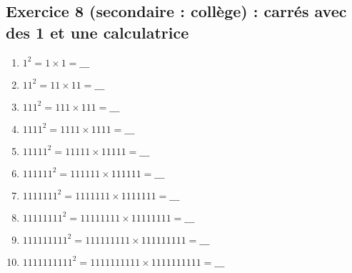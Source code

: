\subsection{Exercice 8 (secondaire : collège) : carrés avec des 1 et une calculatrice}


\label{calc:niveau8}

\begin{enumerate}[label=C\arabic*)]
    \item \(1^2 = 1 \times 1 =  \_\_\_\)
    \item \(11^2 = 11 \times 11 = \_\_\_\)
    \item \(111^2 = 111 \times 111 = \_\_\_\)
    \item \(1111^2 = 1111 \times 1111 = \_\_\_\)
    \item \(11111^2 = 11111 \times 11111 = \_\_\_\)
    \item \(111111^2 = 111111 \times 111111 = \_\_\_\)
    \item \(1111111^2 = 1111111 \times 1111111 = \_\_\_\)
    \item \(11111111^2 = 11111111 \times 11111111 = \_\_\_\)
    \item \(111111111^2 = 111111111 \times 111111111 = \_\_\_\)
    \item \(1111111111^2 = 1111111111 \times 1111111111 = \_\_\_\)
\end{enumerate}